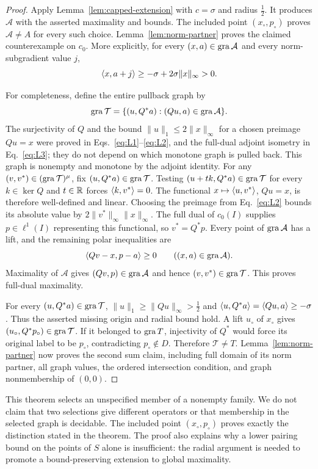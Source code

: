 \begin{proof}
Apply Lemma~\ref{lem:capped-extension} with $c=\sigma$ and radius
$\frac{1}{2}$. It produces $\mathcal A$ with the asserted maximality and
bounds. The included point $(x_\circ,p_\circ)$ proves
$\mathcal A\ne A$ for every such choice. Lemma~\ref{lem:norm-partner}
proves the claimed counterexample on $c_0$. More explicitly, for every
$(x,a)\in\operatorname{gra}\mathcal A$ and every norm-subgradient value $j$,
\[
\langle x,a+j\rangle\ge-\sigma+2\sigma\|x\|_\infty>0.
\]

For completeness, define the entire pullback graph by
\[
\operatorname{gra}\mathcal T=\{(u,Q^*a):(Qu,a)\in\operatorname{gra}\mathcal A\}.
\]
The surjectivity of $Q$ and the bound $\|u\|_1\le2\|x\|_\infty$ for a
chosen preimage $Qu=x$ were proved in
Eqs.~\eqref{eq:L1}--\eqref{eq:L2}, and the full-dual adjoint isometry
in Eq.~\eqref{eq:L3}; they do not depend on which monotone graph is
pulled back. This graph is nonempty and monotone by the adjoint identity.
For any $(v,v^*)\in(\operatorname{gra}\mathcal T)^\mu$, fix
$(u,Q^*a)\in\operatorname{gra}\mathcal T$. Testing $(u+t k,Q^*a)\in\operatorname{gra}\mathcal T$
for every $k\in\ker Q$ and $t\in\mathbb R$ forces $\langle k,v^*\rangle=0$. The functional
$x\mapsto\langle u,v^*\rangle$, $Qu=x$, is therefore well-defined and linear.
Choosing the preimage from Eq.~\eqref{eq:L2} bounds its absolute value
by $2\|v^*\|_\infty\|x\|_\infty$.
The full dual of $c_0(I)$ supplies $p\in\ell^1(I)$ representing this
functional, so $v^*=Q^*p$. Every point of $\operatorname{gra}\mathcal A$ has a lift, and
the remaining polar inequalities are
\[
\langle Qv-x,p-a\rangle\ge0\qquad((x,a)\in\operatorname{gra}\mathcal A).
\]
Maximality of $\mathcal A$ gives $(Qv,p)\in\operatorname{gra}\mathcal A$ and hence
$(v,v^*)\in\operatorname{gra}\mathcal T$. This proves full-dual maximality.

For every $(u,Q^*a)\in\operatorname{gra}\mathcal T$, $\|u\|_1\ge\|Qu\|_\infty>\frac{1}{2}$ and
$\langle u,Q^*a\rangle=\langle Qu,a\rangle\ge-\sigma$. Thus the asserted missing
origin and radial bound hold. A lift $u_\circ$ of $x_\circ$ gives
$(u_\circ,Q^*p_\circ)\in\operatorname{gra}\mathcal T$. If it belonged to $\operatorname{gra} T$,
injectivity of $Q^*$ would force its original label to be $p_\circ$,
contradicting $p_\circ\notin D$. Therefore $\mathcal T\ne T$.
Lemma~\ref{lem:norm-partner} now proves the second sum claim, including
full domain of its norm partner, all graph values, the ordered
intersection condition, and graph nonmembership of $(0,0)$.
\end{proof}

This theorem selects an unspecified member of a nonempty family. We do
not claim that two selections give different operators or that membership
in the selected graph is decidable. The included point $(x_\circ,p_\circ)$ proves exactly the
distinction stated in the theorem. The proof also explains why a lower
pairing bound on the points of $S$ alone is insufficient: the radial argument
is needed to promote a bound-preserving extension to global maximality.


